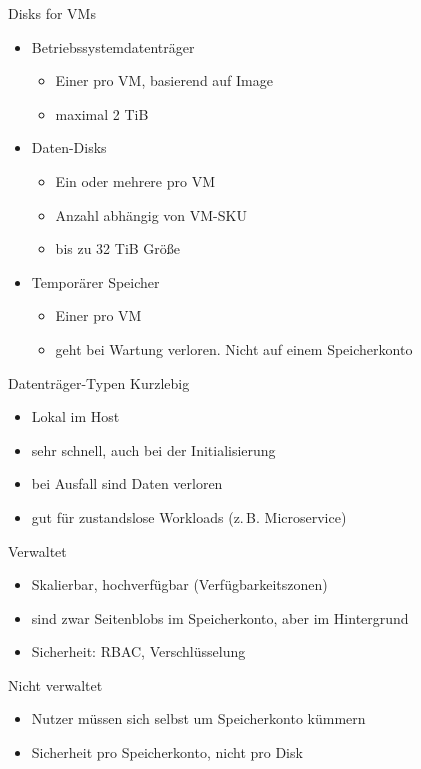 \begin{flashcard}[Definition]{Disks for VMs}
    \begin{itemize}
        \item Betriebssystemdatenträger
            \begin{itemize}
                \item Einer pro VM, basierend auf Image
                \item maximal 2 TiB
            \end{itemize}

        \item Daten-Disks
            \begin{itemize}
                \item Ein oder mehrere pro VM
                \item Anzahl abhängig von VM-SKU
                \item bis zu 32 TiB Größe
            \end{itemize}

        \item Temporärer Speicher\newline
            \begin{itemize}
                \item Einer pro VM
                \item geht bei Wartung verloren. Nicht auf einem Speicherkonto
            \end{itemize}
    \end{itemize}
\end{flashcard}

\begin{flashcard}[Definition]{Datenträger-Typen}
    Kurzlebig
    \begin{itemize}
        \item Lokal im Host
        \item sehr schnell, auch bei der Initialisierung
        \item bei Ausfall sind Daten verloren
        \item gut für zustandslose Workloads (z.\,B. Microservice)
    \end{itemize}
    Verwaltet
    \begin{itemize}
        \item Skalierbar, hochverfügbar (Verfügbarkeitszonen)
        \item sind zwar Seitenblobs im Speicherkonto, aber im Hintergrund
        \item Sicherheit: RBAC, Verschlüsselung
    \end{itemize}
    Nicht verwaltet
    \begin{itemize}
        \item Nutzer müssen sich selbst um Speicherkonto kümmern
        \item Sicherheit pro Speicherkonto, nicht pro Disk
    \end{itemize}
\end{flashcard}

